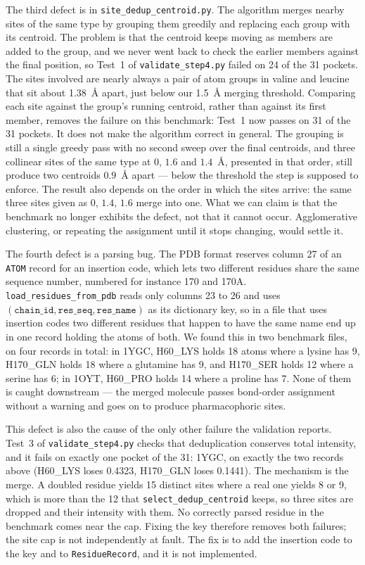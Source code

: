 The third defect is in \texttt{site\_dedup\_centroid.py}. The algorithm merges nearby
sites of the same type by grouping them greedily and replacing each group with its
centroid. The problem is that the centroid keeps moving as members are added to the
group, and we never went back to check the earlier members against the final position, so
Test~1 of \texttt{validate\_step4.py} failed on 24 of the 31 pockets. The sites involved
are nearly always a pair of atom groups in valine and leucine that sit about 1.38~Å
apart, just below our 1.5~Å merging threshold. Comparing each site against the group's
running centroid, rather than against its first member, removes the failure on this
benchmark: Test~1 now passes on 31 of the 31 pockets. It does not make the algorithm
correct in general. The grouping is still a single greedy pass with no second sweep over
the final centroids, and three collinear sites of the same type at $0$, $1.6$ and
$1.4$~Å, presented in that order, still produce two centroids $0.9$~Å apart --- below the
threshold the step is supposed to enforce. The result also depends on the order in which
the sites arrive: the same three sites given as $0$, $1.4$, $1.6$ merge into one. What we
can claim is that the benchmark no longer exhibits the defect, not that it cannot occur.
Agglomerative clustering, or repeating the assignment until it stops changing, would
settle it.

The fourth defect is a parsing bug. The PDB format reserves column 27 of an \texttt{ATOM}
record for an insertion code, which lets two different residues share the same sequence
number, numbered for instance 170 and 170A. \texttt{load\_residues\_from\_pdb} reads only
columns 23 to 26 and uses $(\texttt{chain\_id}, \texttt{res\_seq}, \texttt{res\_name})$ as
its dictionary key, so in a file that uses insertion codes two different residues that
happen to have the same name end up in one record holding the atoms of both. We found
this in two benchmark files, on four records in total: in 1YGC, H60\_LYS holds 18 atoms
where a lysine has 9, H170\_GLN holds 18 where a glutamine has 9, and H170\_SER holds 12
where a serine has 6; in 1OYT, H60\_PRO holds 14 where a proline has 7. None of them is
caught downstream --- the merged molecule passes bond-order assignment without a warning
and goes on to produce pharmacophoric sites.

This defect is also the cause of the only other failure the validation reports. Test~3 of
\texttt{validate\_step4.py} checks that deduplication conserves total intensity, and it
fails on exactly one pocket of the 31: 1YGC, on exactly the two records above
(H60\_LYS loses 0.4323, H170\_GLN loses 0.1441). The mechanism is the merge. A doubled
residue yields 15 distinct sites where a real one yields 8 or 9, which is more than the
12 that \texttt{select\_dedup\_centroid} keeps, so three sites are dropped and their
intensity with them. No correctly parsed residue in the benchmark comes near the cap.
Fixing the key therefore removes both failures; the site cap is not independently at
fault. The fix is to add the insertion code to the key and to
\texttt{ResidueRecord}, and it is not implemented.

